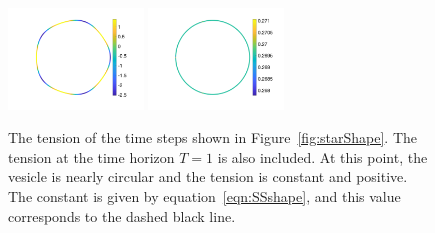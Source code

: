 \documentclass[aps,prl,showpacs]{revtex4}
\begin{document}
\begin{figure}[htp]
\begin{minipage}{0.55\textwidth}
\includegraphics[width=0.32\textwidth]{figures/StarTensionTime5.pdf}
\includegraphics[width=0.32\textwidth]{figures/StarTensionTime6.pdf}
\end{minipage}
  \caption{\label{fig:starTension} The tension of the time steps shown
  in Figure~\ref{fig:starShape}. The tension at the time horizon $T=1$
  is also included. At this point, the vesicle is nearly circular and
  the tension is constant and positive. The constant is given by
  equation~\eqref{eqn:SSshape}, and this value corresponds to the
  dashed black line.}
\end{figure}
\end{document}
